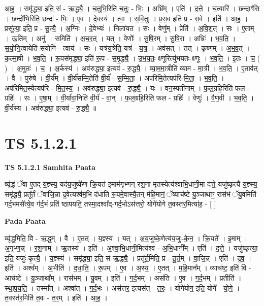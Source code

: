 \documentclass[17pt]{extarticle}
\begin{document}
आ॒ह॒ । समृ॑द्ध्या॒ इति॒ सं - ऋ॒द्ध्यै॒ । च॒तुभि॒रिति॑ च॒तुः - भिः॒ । अभ्रि᳚म् । एति॑ । द॒त्ते॒ । च॒त्वारि॑ । छन्दाꣳ॑सि । छन्दो॑भि॒रिति॒ छन्दः॑ - भिः॒ । ए॒व । दे॒वस्य॑ । त्वा॒ । स॒वि॒तुः । प्र॒स॒व इति॑ प्र - स॒वे । इति॑ । आ॒ह॒ । प्रसू᳚त्या॒ इति॒ प्र - सू॒त्यै॒ । अ॒ग्निः । दे॒वेभ्यः॑ । निला॑यत । सः । वेणु᳚म् । प्रेति॑ । अ॒वि॒श॒त् । सः । ए॒ताम् । ऊ॒तिम् । अनु॑ । समिति॑ । अ॒च॒र॒त् । यत् । वेणोः᳚ । सु॒षि॒रम् । सु॒षि॒रा । अभ्रिः॑ । भ॒व॒ति॒ । स॒यो॒नि॒त्वायेति॑ सयोनि - त्वाय॑ । सः । यत्र॑य॒त्रेति॒ यत्र॑ - य॒त्र॒ । अव॑सत् । तत् । कृ॒ष्णम् । अ॒भ॒व॒त् । क॒ल्मा॒षी । भ॒व॒ति॒ । रू॒पस॑मृद्ध्या॒ इति॑ रू॒प - स॒मृ॒द्ध्यै॒ । उ॒भ॒य॒तः॒ क्ष्णूरित्यु॑भयतः-क्ष्णूः । भ॒व॒ति॒ । इ॒तः । च॒ ( ) । अ॒मुतः॑ । च॒ । अ॒र्कस्य॑ । अव॑रुद्ध्या॒ इत्यव॑ - रु॒द्ध्यै॒ । व्या॒म॒मा॒त्रीति॑ व्याम - मा॒त्री । भ॒व॒ति॒ । ए॒ताव॑त् । वै । पुरु॑षे । वी॒र्य᳚म् । वी॒र्य॑सम्मि॒तेति॑ वी॒र्य॑ - स॒म्मि॒ता॒ । अप॑रिमि॒तेत्यप॑रि-मि॒ता॒ । भ॒व॒ति॒ । अप॑रिमित॒स्येत्यप॑रि - मि॒त॒स्य॒ । अव॑रुद्ध्या॒ इत्यव॑ - रु॒द्ध्यै॒ । यः । वन॒स्पती॑नाम् । फ॒ल॒ग्रहि॒रिति॑ फल - ग्रहिः॑ । सः । ए॒षा॒म् । वी॒र्या॑वा॒निति॑ वी॒र्य॑ - वा॒न् । फ॒ल॒ग्रहि॒रिति॑ फल - ग्रहिः॑ । वेणुः॑ । वै॒ण॒वी । भ॒व॒ति॒ । वी॒र्य॑स्य । अव॑रुद्ध्या॒ इत्यव॑ - रु॒द्ध्यै॒ ॥  \newline




\section*{ TS 5.1.2.1 }

\textbf{TS 5.1.2.1 } \newline
\textbf{Samhita Paata} \newline

व्यृ॑द्धं॒ ॅवा ए॒तद्-य॒ज्ञ्स्य॒ यद॑य॒जुष्के॑ण क्रि॒यत॑ इ॒माम॑गृभ्णन् रश॒ना-मृ॒तस्येत्य॑श्वाभि॒धानी॒मा द॑त्ते॒ यजु॑ष्कृत्यै य॒ज्ञ्स्य॒ समृ॑द्ध्यै॒ प्रतू᳚र्तं ॅवाजि॒न्ना द्र॒वेत्यश्व॑म॒भि द॑धाति रू॒पमे॒वास्यै॒तन् म॑हि॒मानं॒ ॅव्याच॑ष्टे यु॒ञ्जाथाꣳ॒॒ रास॑भं ॅयु॒वमिति॑ गर्द॒भमसे॑त्ये॒व ग॑र्द॒भं प्रति॑ ष्ठापयति॒ तस्मा॒दश्वा᳚द्-गर्द॒भोऽस॑त्तरो॒ योगे॑योगे त॒वस्त॑र॒मित्या॑ह॒ - [  ] \newline

\textbf{Pada Paata} \newline

व्यृ॑द्ध॒मिति॒ वि - ऋ॒द्ध॒म् । वै । ए॒तत् । य॒ज्ञ्स्य॑ । यत् । अ॒य॒जुष्के॒णेत्य॑य॒जुः-के॒न॒ । क्रि॒यते᳚ । इ॒माम् । अ॒गृ॒भ्ण॒न्न् । र॒श॒नाम् । ऋ॒तस्य॑ । इति॑ । अ॒श्वा॒भि॒धानी॒मित्य॑श्व - अ॒भि॒धानी᳚म् । एति॑ । द॒त्ते॒ । यजु॑ष्कृत्या॒ इति॒ यजुः॑-कृ॒त्यै॒ । य॒ज्ञ्स्य॑ । समृ॑द्ध्या॒ इति॒ सं-ऋ॒द्ध्यै॒ । प्रतू᳚र्त॒मिति॒ प्र - तू॒र्त॒म् । वा॒जि॒न्न् । एति॑ । द्र॒व॒ । इति॑ । अश्व᳚म् । अ॒भीति॑ । द॒धा॒ति॒ । रू॒पम् । ए॒व । अ॒स्य॒ । ए॒तत् । म॒हि॒मान᳚म् । व्याच॑ष्ट॒ इति॑ वि - आच॑ष्टे । यु॒ञ्जाथा᳚म् । रास॑भम् । यु॒वम् । इति॑ । ग॒र्द॒भम् । अस॑ति । ए॒व । ग॒र्द॒भम् । प्रतीति॑ । स्था॒प॒य॒ति॒ । तस्मा᳚त् । अश्वा᳚त् । ग॒र्द॒भः । अस॑त्तर॒ इत्यस॑त् - त॒रः॒ । योगे॑योग॒ इति॒ योगे᳚ - यो॒गे॒ । त॒वस्त॑र॒मिति॑ त॒वः - त॒र॒म् । इति॑ । आ॒ह॒ ।  \newline
\end{document}
